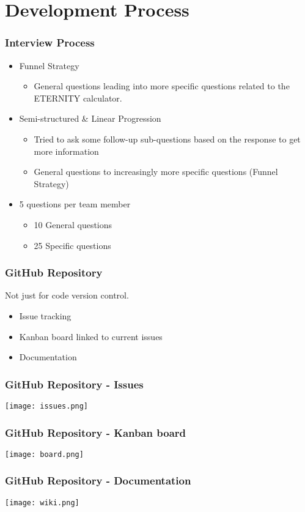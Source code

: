 \documentclass{beamer}
\begin{document}
\section{Development Process}

\begin{frame}
    \frametitle{Interview Process}
    \begin{itemize}
        \item Funnel Strategy 
        \begin{itemize}
            \item General questions leading into more specific questions related to the ETERNITY calculator. \pause
        \end{itemize}

        \item Semi-structured \& Linear Progression
        \begin{itemize}
            \item Tried to ask some follow-up sub-questions based on the response to get more information \pause
            \item General questions to increasingly more specific questions (Funnel Strategy) \pause
        \end{itemize}
        \item 5 questions per team member
        \begin{itemize}
            \item 10 General questions
            \item 25 Specific questions
        \end{itemize}
    \end{itemize}
\end{frame}

\begin{frame}
    \frametitle{GitHub Repository}
    Not just for code version control.
    \begin{itemize}
        \item Issue tracking
        \item Kanban board linked to current issues
        \item Documentation
    \end{itemize}
\end{frame}

\begin{center}
\begin{frame}
    \frametitle{GitHub Repository - Issues}
    \texttt{[image: issues.png]}
\end{frame}

\begin{frame}
    \frametitle{GitHub Repository - Kanban board}
    \texttt{[image: board.png]}
\end{frame}

\begin{frame}
    \frametitle{GitHub Repository - Documentation}
    \texttt{[image: wiki.png]}
\end{frame}
\end{center}
\end{document}
